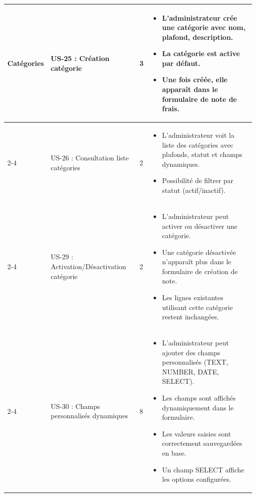 \documentclass[12pt,a4paper]{report}
\begin{document}
\begin{longtable}{|p{2.5cm}|p{3cm}|p{1.5cm}|p{8cm}|}
\multirow{4}{*}{Catégories} & US-25 : Création catégorie & 3 & \begin{itemize}
 \item L’administrateur crée une catégorie avec nom, plafond, description.
 \item La catégorie est active par défaut.
 \item Une fois créée, elle apparaît dans le formulaire de note de frais.
\end{itemize} \\
\cline{2-4}
& US-26 : Consultation liste catégories & 2 & \begin{itemize}
 \item L’administrateur voit la liste des catégories avec plafonds, statut et champs dynamiques.
 \item Possibilité de filtrer par statut (actif/inactif).
\end{itemize} \\
\cline{2-4}
& US-29 : Activation/Désactivation catégorie & 2 & \begin{itemize}
 \item L’administrateur peut activer ou désactiver une catégorie.
 \item Une catégorie désactivée n’apparaît plus dans le formulaire de création de note.
 \item Les lignes existantes utilisant cette catégorie restent inchangées.
\end{itemize} \\
\cline{2-4}
& US-30 : Champs personnalisés dynamiques & 8 & \begin{itemize}
 \item L’administrateur peut ajouter des champs personnalisés (TEXT, NUMBER, DATE, SELECT).
 \item Les champs sont affichés dynamiquement dans le formulaire.
 \item Les valeurs saisies sont correctement sauvegardées en base.
 \item Un champ SELECT affiche les options configurées.
\end{itemize} \\
\hline


\end{longtable}
\end{document}
